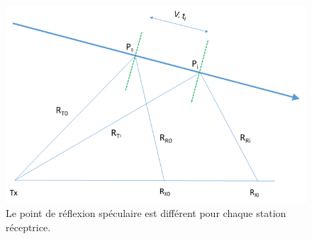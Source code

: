 \documentclass[11pt]{article}
\begin{document}
\begin{figure}[t]
    \begin{center}
        \includegraphics[scale=1]{scema_reflexion_speculaire.png}
        \caption{Le point de réflexion spéculaire est différent pour chaque station réceptrice.}
        \label{fig:specular_reflex}
    \end{center}
\end{figure}

\end{document}
